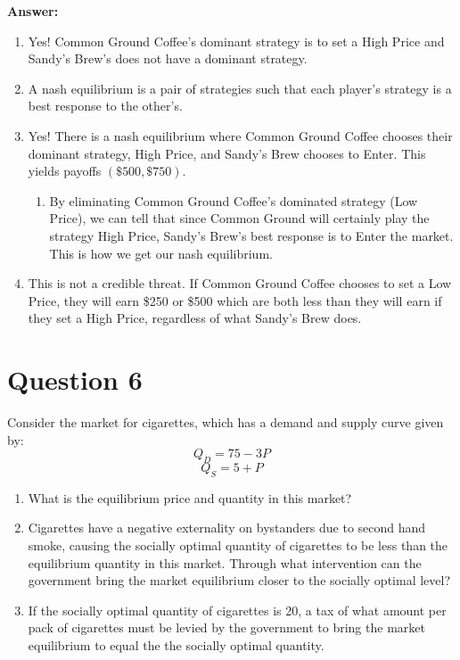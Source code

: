\documentclass[12pt]{article}
\begin{document}
\textbf{Answer:}
\begin{enumerate}[label = (\alph*)]
    \item Yes! Common Ground Coffee's dominant strategy is to set a High Price and Sandy's Brew's does not have a dominant strategy.
    \item A nash equilibrium is a pair of strategies such that each player’s strategy is a best response to the other’s.
    \item Yes! There is a nash equilibrium where Common Ground Coffee chooses their dominant strategy, High Price, and Sandy's Brew chooses to Enter. This yields payoffs $(\$500, \$750)$.
    \begin{enumerate}[label = (\roman*)]
        \item By eliminating Common Ground Coffee's dominated strategy (Low Price), we can tell that since Common Ground will certainly play the strategy High Price, Sandy's Brew's best response is to Enter the market. This is how we get our nash equilibrium.
    \end{enumerate}
    \item This is not a credible threat. If Common Ground Coffee chooses to set a Low Price, they will earn \$250 or \$500 which are both less than they will earn if they set a High Price, regardless of what Sandy's Brew does.
\end{enumerate}

\section*{Question 6}
Consider the market for cigarettes, which has a demand and supply curve given by:
\[Q_D = 75 - 3P\]
\[Q_S = 5 + P\]
\begin{enumerate}[label = (\alph*)]
    \item What is the equilibrium price and quantity in this market?
    \item Cigarettes have a negative externality on bystanders due to second hand smoke, causing the socially optimal quantity of cigarettes to be less than the equilibrium quantity in this market. Through what intervention can the government bring the market equilibrium closer to the socially optimal level?
    \item  If the socially optimal quantity of cigarettes is 20, a tax of what amount per pack of cigarettes must be levied by the government to bring the market equilibrium to equal the the socially optimal quantity.
\end{enumerate}
\end{document}
